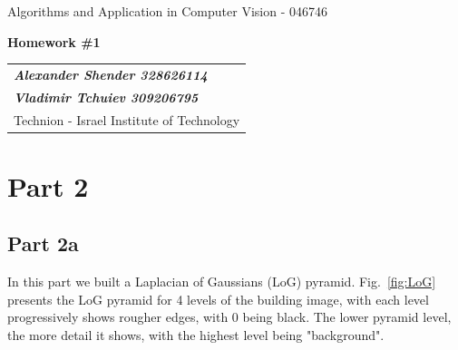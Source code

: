 \documentclass[a4paper]{iacas}
\begin{document}
\begin{center}
 \large Algorithms and Application in Computer Vision - 046746
 \end{center}
\begin{center}
\large\textbf{Homework \#1}
 \end{center}


\begin{tabular}{l}
\\
{\bf\textit{Alexander Shender 328626114}} \\
{\bf\textit{Vladimir Tchuiev 309206795}} \\
Technion - Israel Institute of Technology
\end{tabular}

\vspace{2em}

\section{Part 2}

\subsection{Part 2a}

In this part we built a Laplacian of Gaussians (LoG) pyramid. Fig.~\ref{fig:LoG} presents the LoG pyramid for 4 levels of the building image, with each level progressively shows rougher edges, with 0 being black. The lower pyramid level, the more detail it shows, with the highest level being "background".
\end{document}
